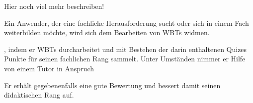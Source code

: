 \begin{k}
Hier noch viel mehr beschreiben!

Ein Anwender, der eine fachliche Herausforderung sucht oder sich in einem Fach
weiterbilden möchte, wird sich dem Bearbeiten von WBTs widmen.


, indem er WBTs durcharbeitet und mit Bestehen
der darin enthaltenen Quizes Punkte für seinen fachlichen Rang sammelt. Unter
Umständen nimmer er Hilfe von einem Tutor in Anspruch

Er erhält gegebenenfalls eine gute Bewertung und
bessert damit seinen didaktischen Rang auf.
\end{k}